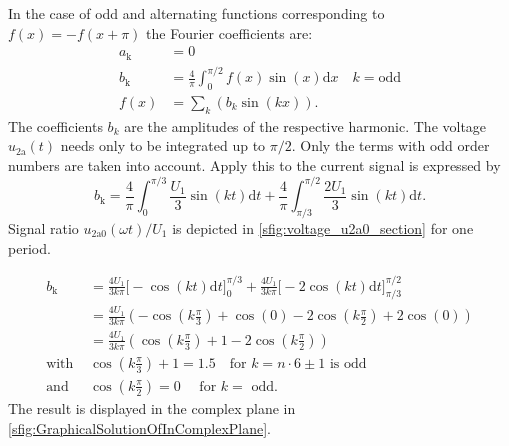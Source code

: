 \begin{solutionblock}
    In the case of odd and alternating functions corresponding to $f(x)=-f(x+\pi)$ the Fourier coefficients are:
    \begin{equation}
        \begin{split}
        a_\mathrm{k} &= 0 \\
        b_\mathrm{k} &= \frac{4}{\pi} \int_0^{\pi/2} f(x)\sin(x) \mathrm{d}x \quad k=\mathrm{odd} \\
        f(x) &= \sum_{k}^{} \left( b_k \sin(kx) \right).
       \end{split}
    \end{equation}
    The coefficients $b_k$ are the amplitudes of the respective harmonic. The voltage $u_{\mathrm{2a}}(t)$ needs 
    only to be integrated up to $\pi/2$. Only the terms with odd order numbers are taken into account.
    Apply this to the current signal is expressed by 
    \begin{equation}
        b_\mathrm{k} = \frac{4}{\pi} \int_0^{\pi/3} \frac{U_{\mathrm{1}}}{3} \sin(kt) \mathrm{d}t 
                        + \frac{4}{\pi} \int_{\pi/3}^{\pi/2} \frac{2U_{\mathrm{1}}}{3} \sin(kt) \mathrm{d}t.
    \end{equation}
    Signal ratio $u_{\mathrm{2a0}}(\omega t)/U_{\mathrm{1}}$ is depicted in \autoref{sfig:voltage_u2a0_section} for one period.
       
    \begin{equation}
        \begin{split}
            b_\mathrm{k} &= \frac{4U_{\mathrm{1}}}{3k\pi} \big[-\cos(kt)\mathrm{d}t \big]_0^{\pi/3}
            + \frac{4U_{\mathrm{1}}}{3k\pi} \big[-2\cos(kt)\mathrm{d}t \big]_{\pi/3}^{\pi/2} \\
            &= \frac{4U_{\mathrm{1}}}{3k\pi} \left(-\cos(k\frac{\pi}{3})+\cos(0) -2 \cos(k\frac{\pi}{2})+ 2\cos(0) \right) \\
            &= \frac{4U_{\mathrm{1}}}{3k\pi} \left( \cos(k\frac{\pi}{3})+ 1 -2 \cos(k\frac{\pi}{2})\right) \\
            \text{with } &\cos(k\frac{\pi}{3})+1=1.5 \quad  \text{for } k=n \cdot 6\pm1 \text{ is odd} \\
            \text{and  }&\cos(k\frac{\pi}{2})=0 \quad \text{ for } k=\text{ odd}.
        \end{split}            
    \end{equation}
    The result is displayed in the complex plane in \autoref{sfig:GraphicalSolutionOfInComplexPlane}. 


\end{solutionblock}
